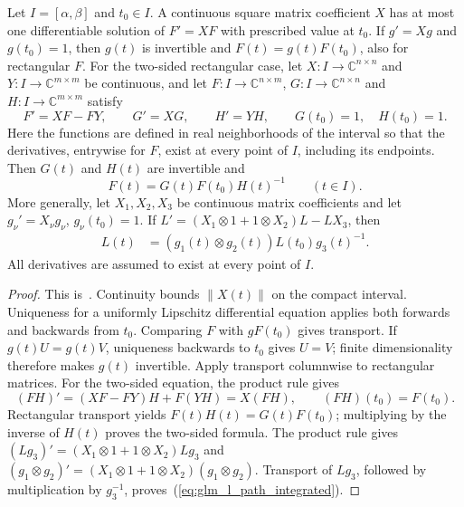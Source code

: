 \begin{lemma}
    \leanok
    \label{lem:glm_l_path_matrix_ode}
    Let $I=[\alpha,\beta]$ and $t_0\in I$. A continuous square matrix
    coefficient $X$ has at most one differentiable solution of $F'=XF$
    with prescribed value at $t_0$. If $g'=Xg$ and $g(t_0)=1$, then $g(t)$
    is invertible and $F(t)=g(t)F(t_0)$, also for rectangular $F$.
    For the two-sided rectangular case, let $X:I\to\mathbb C^{n\times n}$
    and $Y:I\to\mathbb C^{m\times m}$ be continuous, and let
    $F:I\to\mathbb C^{n\times m}$, $G:I\to\mathbb C^{n\times n}$ and
    $H:I\to\mathbb C^{m\times m}$ satisfy
    \[
        F'=XF-FY,\qquad G'=XG,\qquad H'=YH,\qquad G(t_0)=1,\quad H(t_0)=1.
    \]
    Here the functions are defined in real neighborhoods of the interval so
    that the derivatives, entrywise for $F$, exist at every point of $I$,
    including its endpoints. Then $G(t)$ and $H(t)$ are invertible and
    \[
        F(t)=G(t)F(t_0)H(t)^{-1}\qquad(t\in I).
    \]
    More generally, let $X_1,X_2,X_3$ be continuous matrix coefficients
    and let $g_\nu'=X_\nu g_\nu$, $g_\nu(t_0)=1$. If
    $L'= (X_1\otimes1+1\otimes X_2)L-LX_3$, then
    \begin{align}
        L(t) & =(g_1(t)\otimes g_2(t))L(t_0)g_3(t)^{-1}.
        \label{eq:glm_l_path_integrated}
    \end{align}
    All derivatives are assumed to exist at every point of $I$.
\end{lemma}
\begin{proof}
    \leanok
    This is~\cite[``Transport by a continuous matrix differential
        equation'']{QICLean2026Blueprint}.
    Continuity bounds $\|X(t)\|$ on the compact interval. Uniqueness for a
    uniformly Lipschitz differential equation applies both forwards and
    backwards from $t_0$. Comparing $F$ with $gF(t_0)$ gives transport.
    If $g(t)U=g(t)V$, uniqueness backwards to $t_0$ gives $U=V$;
    finite dimensionality therefore makes $g(t)$ invertible.
    Apply transport columnwise to rectangular matrices. For the two-sided
    equation, the product rule gives
    \[
        (FH)'=(XF-FY)H+F(YH)=X(FH),\qquad (FH)(t_0)=F(t_0).
    \]
    Rectangular transport yields $F(t)H(t)=G(t)F(t_0)$; multiplying by
    the inverse of $H(t)$ proves the two-sided formula. The product rule
    gives $(Lg_3)'=(X_1\otimes1+1\otimes X_2)Lg_3$ and
    $(g_1\otimes g_2)'=(X_1\otimes1+1\otimes X_2)(g_1\otimes g_2)$.
    Transport of $Lg_3$, followed by multiplication by $g_3^{-1}$,
    proves~(\ref{eq:glm_l_path_integrated}).
\end{proof}

